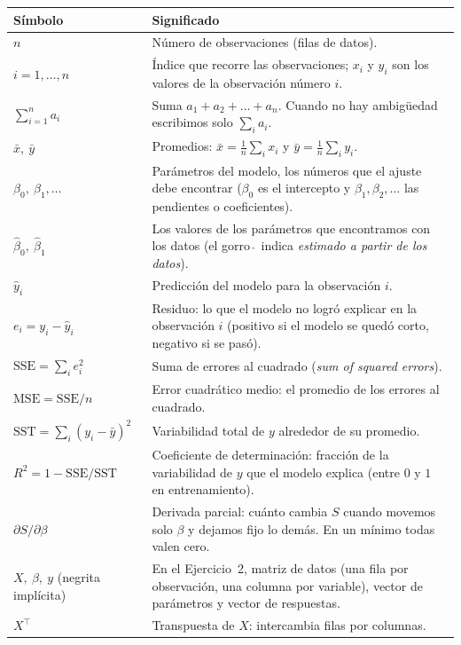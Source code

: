 \begin{table}[H]
\centering
\small
\begin{tabular}{>{\raggedright\arraybackslash}p{3.2cm}>{\raggedright\arraybackslash}p{11.3cm}}
\toprule
Símbolo & Significado \\
\midrule
$n$ & Número de observaciones (filas de datos). \\
$i=1,\dots,n$ & Índice que recorre las observaciones; $x_i$ y $y_i$ son
los valores de la observación número $i$. \\
$\sum_{i=1}^{n} a_i$ & Suma $a_1+a_2+\dots+a_n$. Cuando no hay ambigüedad
escribimos solo $\sum_i a_i$. \\
$\bar x,\ \bar y$ & Promedios: $\bar x=\frac1n\sum_i x_i$ y
$\bar y=\frac1n\sum_i y_i$. \\
$\beta_0,\ \beta_1,\dots$ & Parámetros del modelo, los números que el
ajuste debe encontrar ($\beta_0$ es el intercepto y $\beta_1,\beta_2,\dots$
las pendientes o coeficientes). \\
$\hat\beta_0,\ \hat\beta_1$ & Los valores de los parámetros que encontramos
con los datos (el gorro $\hat{\ }$ indica \emph{estimado a partir de los
datos}). \\
$\hat y_i$ & Predicción del modelo para la observación $i$. \\
$e_i = y_i-\hat y_i$ & Residuo: lo que el modelo no logró explicar en la
observación $i$ (positivo si el modelo se quedó corto, negativo si se
pasó). \\
$\mathrm{SSE}=\sum_i e_i^2$ & Suma de errores al cuadrado (\emph{sum of
squared errors}). \\
$\mathrm{MSE}=\mathrm{SSE}/n$ & Error cuadrático medio: el promedio de los
errores al cuadrado. \\
$\mathrm{SST}=\sum_i (y_i-\bar y)^2$ & Variabilidad total de $y$ alrededor
de su promedio. \\
$R^2=1-\mathrm{SSE}/\mathrm{SST}$ & Coeficiente de determinación: fracción
de la variabilidad de $y$ que el modelo explica (entre $0$ y $1$ en
entrenamiento). \\
$\partial S/\partial \beta$ & Derivada parcial: cuánto cambia $S$ cuando
movemos solo $\beta$ y dejamos fijo lo demás. En un mínimo todas valen
cero. \\
$X,\ \beta,\ y$ (negrita implícita) & En el Ejercicio~2, matriz de datos
(una fila por observación, una columna por variable), vector de parámetros
y vector de respuestas. \\
$X^\top$ & Transpuesta de $X$: intercambia filas por columnas. \\

\end{tabular}
\end{table}
